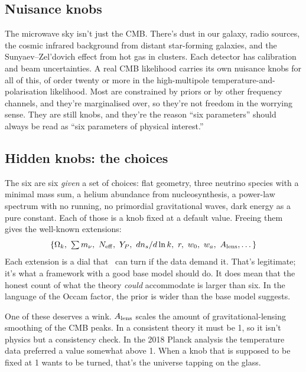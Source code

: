 \subsection{Nuisance knobs}

The microwave sky isn't just the CMB. There's dust in our galaxy, radio sources, the cosmic infrared background from distant star-forming galaxies, and the Sunyaev--Zel'dovich effect from hot gas in clusters. Each detector has calibration and beam uncertainties. A real CMB likelihood carries its own nuisance knobs for all of this, of order twenty or more in the high-multipole temperature-and-polarisation likelihood. Most are constrained by priors or by other frequency channels, and they're marginalised over, so they're not freedom in the worrying sense. They are still knobs, and they're the reason ``six parameters'' should always be read as ``six parameters of physical interest.''




\subsection{Hidden knobs: the choices}

The six are six \emph{given} a set of choices: flat geometry, three neutrino species with a minimal mass sum, a helium abundance from nucleosynthesis, a power-law spectrum with no running, no primordial gravitational waves, dark energy as a pure constant. Each of those is a knob fixed at a default value. Freeing them gives the well-known extensions:
\begin{equation}
\{\Omega_k,\ \textstyle\sum m_\nu,\ N_{\rm eff},\ Y_P,\ dn_s/d\ln k,\ r,\ w_0,\ w_a,\ A_{\rm lens},\dots\}
\end{equation}
Each extension is a dial that \LCDM\ can turn if the data demand it. That's legitimate; it's what a framework with a good base model should do. It does mean that the honest count of what the theory \emph{could} accommodate is larger than six. In the language of the Occam factor, the prior is wider than the base model suggests.

One of these deserves a wink. $A_{\rm lens}$ scales the amount of gravitational-lensing smoothing of the CMB peaks. In a consistent theory it must be 1, so it isn't physics but a consistency check. In the 2018 Planck analysis the temperature data preferred a value somewhat above 1. When a knob that is supposed to be fixed at 1 wants to be turned, that's the universe tapping on the glass.

